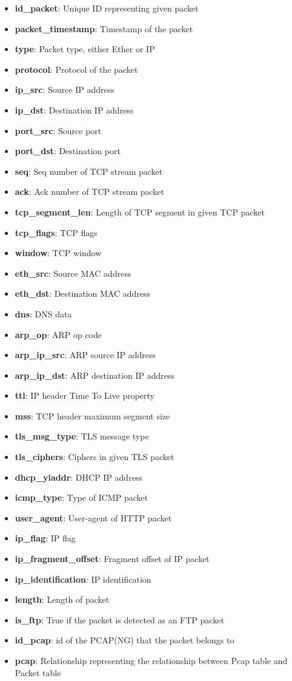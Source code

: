 \documentclass[
  printed,     %
  color,       %
  oneside,     %
  nosansbold,  %
  nocolorbold, %
  nolof,         %
  nolot,         %
]{fithesis4}
\begin{document}
\begin{itemize}[noitemsep,topsep=0pt]
    \item \textbf{id\_packet}: Unique ID representing given packet
    \item \textbf{packet\_timestamp}: Timestamp of the packet
    \item \textbf{type}: Packet type, either Ether or IP
    \item \textbf{protocol}: Protocol of the packet
    \item \textbf{ip\_src}: Source IP address
    \item \textbf{ip\_dst}: Destination IP address
    \item \textbf{port\_src}: Source port
    \item \textbf{port\_dst}: Destination port
    \item \textbf{seq}: Seq number of TCP stream packet
    \item \textbf{ack}: Ack number of TCP stream packet
    \item \textbf{tcp\_segment\_len}: Length of TCP segment in given TCP packet
    \item \textbf{tcp\_flags}: TCP flags
    \item \textbf{window}: TCP window
    \item \textbf{eth\_src}: Source MAC address
    \item \textbf{eth\_dst}: Destination MAC address
    \item \textbf{dns}: DNS data
    \item \textbf{arp\_op}: ARP op code
    \item \textbf{arp\_ip\_src}: ARP source IP address
    \item \textbf{arp\_ip\_dst}: ARP destination IP address
    \item \textbf{ttl}: IP header Time To Live property
    \item \textbf{mss}: TCP header maximum segment size
    \item \textbf{tls\_msg\_type}: TLS message type
    \item \textbf{tls\_ciphers}: Ciphers in given TLS packet
    \item \textbf{dhcp\_yiaddr}: DHCP IP address
    \item \textbf{icmp\_type}: Type of ICMP packet
    \item \textbf{user\_agent}: User-agent of HTTP packet
    \item \textbf{ip\_flag}: IP flag
    \item \textbf{ip\_fragment\_offset}: Fragment offset of IP packet
    \item \textbf{ip\_identification}: IP identification
    \item \textbf{length}: Length of packet
    \item \textbf{is\_ftp}: True if the packet is detected as an FTP packet
    \item \textbf{id\_pcap}: id of the PCAP(NG) that the packet belongs to
    \item \textbf{pcap}: Relationship representing the relationship between Pcap table and Packet table
\end{itemize}
\end{document}

